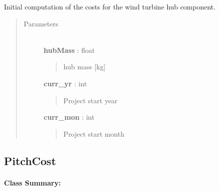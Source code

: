 \documentclass[letterpaper,10pt,openany,oneside]{sphinxmanual}
\begin{document}
\begin{fulllineitems}
\label{documentation:turbine_costSE.src.rotor_costsSE.HubCost}
Initial computation of the costs for the wind turbine hub component.
\begin{quote}\begin{description}
\item[{Parameters }] \leavevmode\\
\textbf{hubMass} : float
\begin{quote}

hub mass {[}kg{]}
\end{quote}

\textbf{curr\_yr} : int
\begin{quote}

Project start year
\end{quote}

\textbf{curr\_mon} : int
\begin{quote}

Project start month
\end{quote}

\end{description}\end{quote}

\end{fulllineitems}



\subsection{PitchCost}
\label{documentation:pitchcost}\label{documentation:pitchcost-class-label}\paragraph{Class Summary:}
\end{document}
